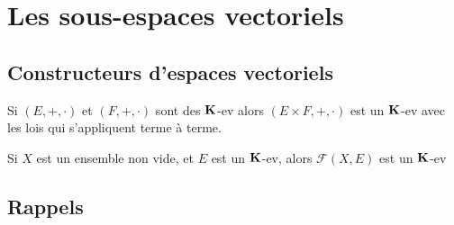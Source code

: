 
\section{Les sous-espaces vectoriels}

\subsection{Constructeurs d'espaces vectoriels}

Si $(E, +, \cdot)$ et  $(F, +, \cdot)$ sont des  $\mathbf K$-ev alors $(E\times F, +, \cdot)$ est un  $\mathbf K$-ev avec les lois qui s'appliquent terme à terme.

Si $X$ est un ensemble non vide, et $E$ est un  $\mathbf K$-ev, alors $\mathcal F(X,E)$ est un  $\mathbf K$-ev

\subsection{Rappels}

